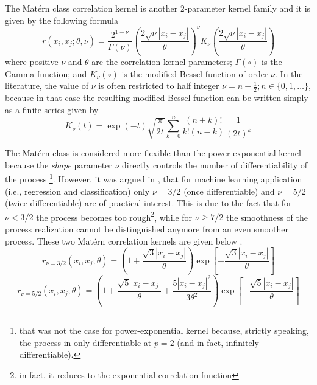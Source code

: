 The Mat\'ern class correlation kernel is another $2$-parameter kernel family and it is given by the following formula \cite{Santner2003,Rasmussen2006}
\begin{equation}
	r(x_i, x_j; \theta, \nu) = \frac{2^{1-\nu}}{\Gamma(\nu)} \left(\frac{2\sqrt{\nu} |x_i - x_j|}{\theta}\right)^\nu K_{\nu}\left(\frac{2\sqrt{\nu} |x_i - x_j|}{\theta}\right)
\label{eq:matern_kernel}
\end{equation}
where positive $\nu$ and $\theta$ are the correlation kernel parameters;
$\Gamma(\circ)$ is the Gamma function;
and $K_\nu (\circ)$ is the modified Bessel function of order $\nu$.
In the literature, the value of $\nu$ is often restricted to half integer $\nu = n + \frac{1}{2}; n \in \{0,1,\ldots\}$,
because in that case the resulting modified Bessel function can be written simply as a finite series given by
\begin{equation}
	K_\nu(t) = \exp{(-t)} \sqrt{\frac{\pi}{2t}} \sum_{k = 0}^{n} \frac{(n+k)!}{k! (n-k)} \frac{1}{(2t)^k}
\label{eq:modified_bessel}
\end{equation}

The Mat\'ern class is considered more flexible than the power-expo\-nential kernel because the \emph{shape} parameter $\nu$ directly controls the number of differentiability of the process \cite{Stein1989}\footnote{that was not the case for power-exponential kernel because, strictly speaking, the process in only differentiable at $p = 2$ (and in fact, infinitely differentiable).}.
However, it was argued in \cite{Rasmussen2006}, that for machine learning application (i.e., regression and classification) only $\nu = 3/2$ (once differentiable) and $\nu = 5/2$ (twice differentiable) are of practical interest.
This is due to the fact that for $\nu < 3/2$ the process becomes too rough\footnote{in fact, it reduces to the exponential correlation function},
while for $\nu \geq 7/2$ the smoothness of the process realization cannot be distinguished anymore from an even smoother process.
These two Mat\'ern correlation kernels are given below \cite{Roustant2012,Rasmussen2006}.
\begin{equation}
	r_{\nu=3/2}(x_i, x_j;\theta) = \left(1 + \frac{\sqrt{3}|x_i - x_j|}{\theta}\right) \exp{\left[-\frac{\sqrt{3} |x_i - x_j|}{\theta}\right]}
\label{eq:matern3_2}
\end{equation}
\begin{equation}
	r_{\nu=5/2}(x_i, x_j;\theta) = \left(1 + \frac{\sqrt{5}|x_i - x_j|}{\theta} + \frac{5|x_i - x_j|^2}{3\theta^2}\right) \exp{\left[-\frac{\sqrt{5} |x_i - x_j|}{\theta}\right]}
\label{eq:matern5_2}
\end{equation}

